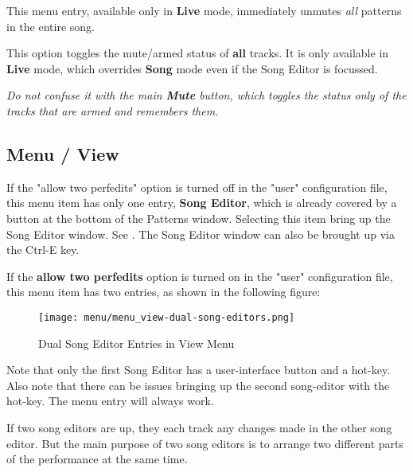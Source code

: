 
   This menu entry, available only in \textbf{Live} mode,
   immediately unmutes \textsl{all} patterns in the entire song.


   This option toggles the mute/armed status of \textbf{all} tracks.
   It is only available in \textbf{Live} mode, which overrides \textbf{Song}
   mode even if the Song Editor is focussed.

   \textsl{Do not confuse it with the main \textbf{Mute} button, which toggles the
   status only of the tracks that are armed and remembers them.}

\subsection{Menu / View}
\label{subsec:seq64_menu_view}

   If the "allow two perfedits" option is turned off in the "user"
   configuration file, this menu item has only one entry, \textbf{Song Editor}, 
   which is already covered by a button at the bottom of the Patterns
   window.  Selecting this item bring up the Song Editor window.
   See .
   The Song Editor window can also be brought up via the
   Ctrl-E key.

   If the \textbf{allow two perfedits} option is turned on in the "user"
   configuration file, this menu item has two entries, as shown in the
   following figure:

\begin{figure}[H]
   \centering 
   \texttt{[image: menu/menu\_view-dual-song-editors.png]}
   \caption{Dual Song Editor Entries in View Menu}
   \label{fig:seq64_menu_view_song_editors}
\end{figure}

   Note that only the first Song Editor has a user-interface button and
   a hot-key.  Also note that there can be issues bringing up the second
   song-editor with the hot-key.  The menu entry will always work.

   If two song editors are up, they each track any changes made in the other
   song editor.  But the main purpose of two song editors is to arrange two
   different parts of the performance at the same time.


